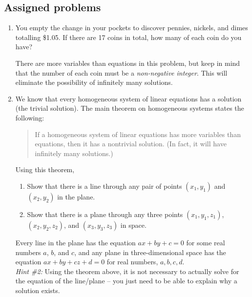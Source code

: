 \documentclass[letterpaper,12pt]{article}
\begin{document}
\subsection*{Assigned problems}
\begin{enumerate}
 \item You empty the change in your pockets to discover pennies, nickels, and dimes totalling \$1.05. If there are 17 coins in total, how many of each coin do you have?
 
  There are more variables than equations in this problem, but keep in mind that the number of each coin must be a {\em non-negative integer}. This will eliminate the possibility of infinitely many solutions.
 
 \item We know that every homogeneous system of linear equations has a solution (the trivial solution). The main theorem on homogeneous systems states the following:
 \begin{quotation}
 If a homogeneous system of linear equations has more variables than equations, then it has a nontrivial solution. (In fact, it will have infinitely many solutions.)
 \end{quotation}
 Using this theorem,
 \begin{enumerate}
 \item Show that there is a line through any pair of points $(x_1,y_1)$ and $(x_2,y_2)$ in the plane.
 \item Show that there is a plane through any three points $(x_1,y_1,z_1)$, $(x_2,y_2,z_2)$, and $(x_3,y_3,z_3)$ in space.
 \end{enumerate}
  Every line in the plane has the equation $ax+by+c=0$ for some real numbers $a$, $b$, and $c$, and any plane in three-dimensional space has the equation $ax+by+cz+d=0$ for real numbers, $a,b,c,d$. \\
 {\em Hint \#2:} Using the theorem above, it is not necessary to actually solve for the equation of the line/plane -- you just need to be able to explain why a solution exists.


\end{enumerate}
\end{document}
